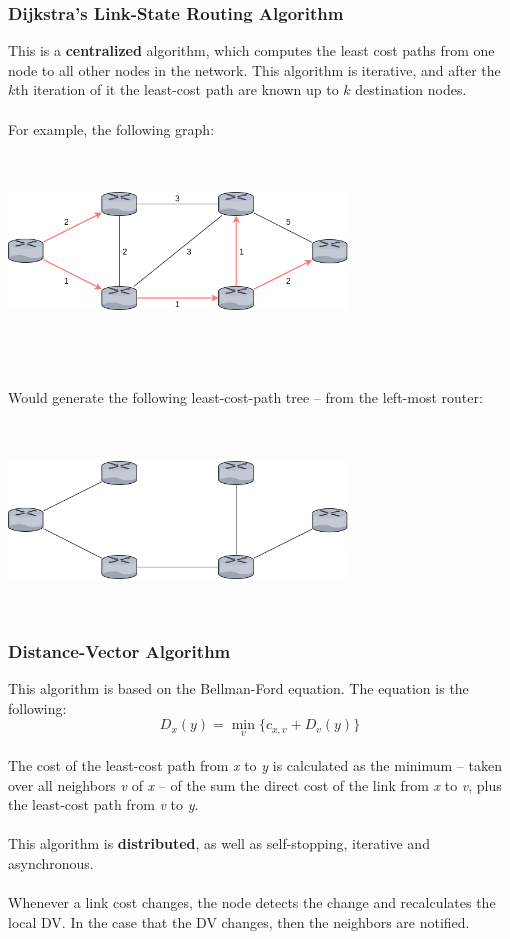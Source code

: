 \documentclass{article}
\begin{document}
\subsubsection{Dijkstra's Link-State Routing Algorithm}
This is a \textbf{centralized} algorithm, which computes the least cost paths from one node to all other nodes in the network. This algorithm is iterative, and after the $k$th iteration of it the least-cost path are known up to $k$ destination nodes. \\ \\
For example, the following graph: \\ \\ \\
\centerline{\includegraphics[width=9cm]{./assets/dls_1.png}} \\ \\ \\
Would generate the following least-cost-path tree -- from the left-most router: \\ \\ \\
\centerline{\includegraphics[width=9cm]{./assets/dls_2.png}} \\

\subsubsection{Distance-Vector Algorithm}
This algorithm is based on the Bellman-Ford equation. The equation is the following: \\
\[ D_x(y) = \min_v\{ c_{x, v} + D_v(y) \} \] \\
The cost of the least-cost path from \textit{x} to \textit{y} is calculated as the minimum -- taken over all neighbors \textit{v} of \textit{x} -- of the sum the direct cost of the link from \textit{x} to \textit{v}, plus the least-cost path from \textit{v} to \textit{y}. \\ \\
This algorithm is \textbf{distributed}, as well as self-stopping, iterative and asynchronous. \\ \\
Whenever a link cost changes, the node detects the change and recalculates the local DV. In the case that the DV changes, then the neighbors are notified.
\end{document}
